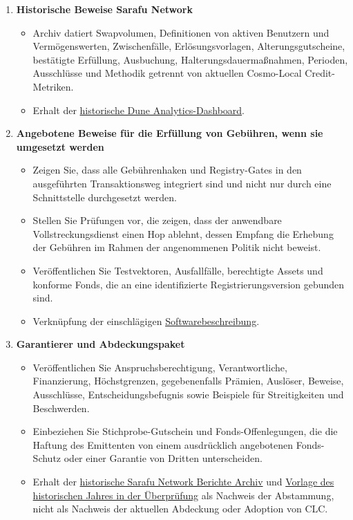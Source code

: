 \documentclass[11pt]{article}
\begin{document}
\begin{enumerate}[leftmargin=*]
\item \textbf{Historische Beweise Sarafu Network}
\begin{itemize}[leftmargin=*]
\item Archiv datiert Swapvolumen, Definitionen von aktiven Benutzern und Vermögenswerten, Zwischenfälle, Erlösungsvorlagen, Alterungsgutscheine, bestätigte Erfüllung, Ausbuchung, Halterungsdauermaßnahmen, Perioden, Ausschlüsse und Methodik getrennt von aktuellen Cosmo-Local Credit-Metriken.
\item Erhalt der \href{https://dune.com/grassrootseconomics/sarafu-network}{historische Dune Analytics-Dashboard}.
\end{itemize}
\item \textbf{Angebotene Beweise für die Erfüllung von Gebühren, wenn sie umgesetzt werden}
\begin{itemize}[leftmargin=*]
\item Zeigen Sie, dass alle Gebührenhaken und Registry-Gates in den ausgeführten Transaktionsweg integriert sind und nicht nur durch eine Schnittstelle durchgesetzt werden.
\item Stellen Sie Prüfungen vor, die zeigen, dass der anwendbare Vollstreckungsdienst einen Hop ablehnt, dessen Empfang die Erhebung der Gebühren im Rahmen der angenommenen Politik nicht beweist.
\item Veröffentlichen Sie Testvektoren, Ausfallfälle, berechtigte Assets und konforme Fonds, die an eine identifizierte Registrierungsversion gebunden sind.
\item Verknüpfung der einschlägigen \href{https://software.grassecon.org}{Softwarebeschreibung}.
\end{itemize}
\item \textbf{Garantierer und Abdeckungspaket}
\begin{itemize}[leftmargin=*]
\item Veröffentlichen Sie Anspruchsberechtigung, Verantwortliche, Finanzierung, Höchstgrenzen, gegebenenfalls Prämien, Auslöser, Beweise, Ausschlüsse, Entscheidungsbefugnis sowie Beispiele für Streitigkeiten und Beschwerden.
\item Einbeziehen Sie Stichprobe-Gutschein und Fonds-Offenlegungen, die die Haftung des Emittenten von einem ausdrücklich angebotenen Fonds-Schutz oder einer Garantie von Dritten unterscheiden.
\item Erhalt der \href{https://sarafu.network/reports}{historische Sarafu Network Berichte Archiv} und \href{https://youtu.be/5yGaP31bvs0?si=fZ-AMTEXsmVR8Ulv}{Vorlage des historischen Jahres in der Überprüfung} als Nachweis der Abstammung, nicht als Nachweis der aktuellen Abdeckung oder Adoption von CLC.

\end{itemize}
\end{enumerate}
\end{document}
